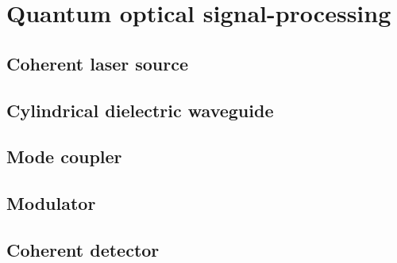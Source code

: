 \chapter{Quantum optical signal-processing}

\section{Coherent laser source}
\section{Cylindrical dielectric waveguide}
\section{Mode coupler}
\section{Modulator}
\section{Coherent detector}